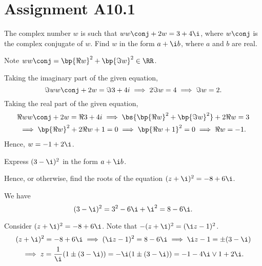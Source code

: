 \section{Assignment A10.1}

\begin{problem}
    The complex number $w$ is such that $w w\conj + 2w = 3 + 4\i$, where $w\conj$ is the complex conjugate of $w$. Find $w$ in the form $a + \i b$, where $a$ and $b$ are real.
\end{problem}
\begin{solution}
    Note $w w\conj = \bp{\Re w}^2 + \bp{\Im w}^2 \in \RR$.

    Taking the imaginary part of the given equation, \[\Im{ww\conj + 2w} = \Im{3 + 4i} \implies 2 \Im w = 4 \implies \Im w = 2.\] Taking the real part of the given equation,
    \begin{gather*}
        \Re{ww\conj + 2w} = \Re{3 + 4i} \implies \bs{\bp{\Re w}^2 + \bp{\Im w}^2} + 2\Re w = 3\\
        \implies \bp{\Re w}^2 + 2\Re {w} + 1 = 0 \implies \bp{\Re w + 1}^2 = 0 \implies \Re{w} = -1.
    \end{gather*}
    Hence, $w = -1 + 2\i$.
\end{solution}

\begin{problem}
    Express $(3 - \i)^2$ in the form $a + \i b$.

    Hence, or otherwise, find the roots of the equation $(z+\i)^2 = -8+6\i$.
\end{problem}
\begin{solution}
    We have \[(3 - \i)^2 = 3^2 - 6 \i + \i^2 = 8 - 6\i.\]

    Consider $(z+\i)^2 = -8+6\i$. Note that $-(z+\i)^2 = (\i z - 1)^2$.
    \begin{gather*}
        (z+\i)^2 = -8 + 6\i \implies (\i z - 1)^2 = 8 - 6\i \implies \i z - 1 = \pm (3 - \i)\\
        \implies z = \frac1\i (1 \pm (3 - \i)) = -\i(1 \pm (3 - \i)) = -1-4\i \lor 1 + 2\i.
    \end{gather*}
\end{solution}


